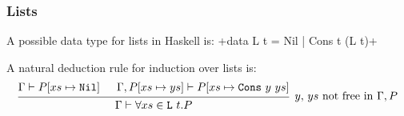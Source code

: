 \subsubsection{Lists}
A possible data type for lists in Haskell is:
+data L t = Nil | Cons t (L t)+

A natural deduction rule for induction over lists is:
\[
    \begin{prooftree}
        \hypo{\Gamma \vdash P[xs \mapsto \texttt{Nil}]}
        \hypo{\Gamma, P[xs \mapsto ys] \vdash P[xs \mapsto \texttt{Cons}\ y\ ys]}
        \infer2[$y$, $ys$ not free in $\Gamma, P$]{\Gamma \vdash \forall xs \in \texttt{L}\ t. P}
    \end{prooftree}
\]
